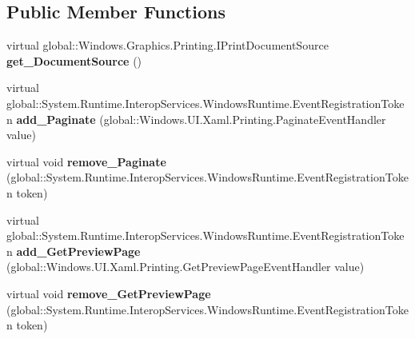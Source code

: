\subsection*{Public Member Functions}
\begin{DoxyCompactItemize}
\item 
\mbox{\label{class_windows_1_1_u_i_1_1_xaml_1_1_printing_1_1_print_document_a58bc53aad6d052d4b2a25935ba3f7844}} 
virtual global\+::\+Windows.\+Graphics.\+Printing.\+I\+Print\+Document\+Source {\bfseries get\+\_\+\+Document\+Source} ()
\item 
\mbox{\label{class_windows_1_1_u_i_1_1_xaml_1_1_printing_1_1_print_document_a9c15072b2efeea170b01106af19c20d2}} 
virtual global\+::\+System.\+Runtime.\+Interop\+Services.\+Windows\+Runtime.\+Event\+Registration\+Token {\bfseries add\+\_\+\+Paginate} (global\+::\+Windows.\+U\+I.\+Xaml.\+Printing.\+Paginate\+Event\+Handler value)
\item 
\mbox{\label{class_windows_1_1_u_i_1_1_xaml_1_1_printing_1_1_print_document_af8447e29ab1c6aeff221a7ecf57c48a5}} 
virtual void {\bfseries remove\+\_\+\+Paginate} (global\+::\+System.\+Runtime.\+Interop\+Services.\+Windows\+Runtime.\+Event\+Registration\+Token token)
\item 
\mbox{\label{class_windows_1_1_u_i_1_1_xaml_1_1_printing_1_1_print_document_a7f3e8c94058352a6d36e6c86a1f14425}} 
virtual global\+::\+System.\+Runtime.\+Interop\+Services.\+Windows\+Runtime.\+Event\+Registration\+Token {\bfseries add\+\_\+\+Get\+Preview\+Page} (global\+::\+Windows.\+U\+I.\+Xaml.\+Printing.\+Get\+Preview\+Page\+Event\+Handler value)
\item 
\mbox{\label{class_windows_1_1_u_i_1_1_xaml_1_1_printing_1_1_print_document_a049493be7cb40ba87e23a1fff9cca61a}} 
virtual void {\bfseries remove\+\_\+\+Get\+Preview\+Page} (global\+::\+System.\+Runtime.\+Interop\+Services.\+Windows\+Runtime.\+Event\+Registration\+Token token)
\item 
\mbox{\label{class_windows_1_1_u_i_1_1_xaml_1_1_printing_1_1_print_document_abcf27815570562c0335caae5ab74ff34}} 

\end{DoxyCompactItemize}
